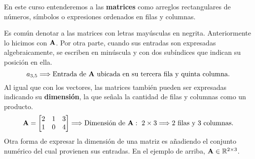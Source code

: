 \documentclass[12pt]{article}
\begin{document}
\newpage

\begin{figure}[hbt!]
\centering

\end{figure}

En este curso entenderemos a las \textbf{matrices} como arreglos rectangulares de números, símbolos o expresiones ordenados en filas y columnas.

Es común denotar a las matrices con letras mayúsculas en negrita. Anteriormente lo hicimos con $\mathbf{A}$. Por otra parte, cuando sus entradas son expresadas algebraicamente, se escriben en minúscula y con dos subíndices que indican su posición en ella.
\[
  a_{3,5} \Longrightarrow \text{Entrada de } \mathbf{A} \text{ ubicada en su tercera fila y quinta columna.}
\]
Al igual que con los vectores, las matrices también pueden ser expresadas indicando su \textbf{dimensión}, la que señala la cantidad de filas y columnas como un producto.
\[
\mathbf{A} =
\begin{bmatrix}
2 & 1 & 3 \\
1 & 0 & 4
\end{bmatrix}
\Longrightarrow
\text{Dimensión de } \mathbf{A}: \ 2 \times 3
\Longrightarrow
2 \text{ filas y } 3 \text{ columnas.}
\]
Otra forma de expresar la dimensión de una matriz es añadiendo el conjunto numérico del cual provienen sus entradas. En el ejemplo de arriba, $\mathbf{A} \in \mathbb{R}^{2 \times 3}$.
\end{document}

